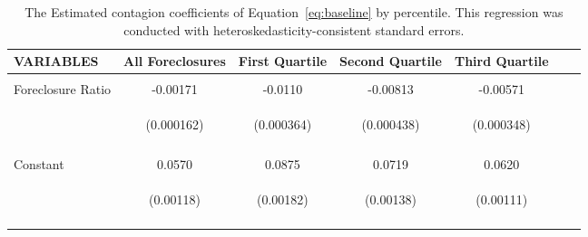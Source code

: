 
\begin{table}\Tiny\label{table:basic_results}
\begin{centering}
\caption{\Tiny The Estimated contagion coefficients of Equation~\ref{eq:baseline} by percentile. This regression was conducted with heteroskedasticity-consistent standard errors.}

\begin{tabular}{lcccccc} \hline

VARIABLES & All Foreclosures & First Quartile & Second Quartile & Third Quartile \\ \hline
 &    &  &  &  \\
Foreclosure Ratio                 &-0.00171 & -0.0110 & -0.00813&-0.00571 \\
&\begin{footnotesize}\tiny(0.000162)\end{footnotesize} & \begin{footnotesize}\tiny(0.000364)\end{footnotesize} &  \begin{footnotesize}\tiny(0.000438)\end{footnotesize} & 
\begin{footnotesize}\tiny(0.000348)\end{footnotesize} \\
\vspace{4pt}& \begin{footnotesize}\end{footnotesize} & \begin{footnotesize}\end{footnotesize} & \begin{footnotesize}\end{footnotesize} & \begin{footnotesize}\end{footnotesize} \\
Constant                          & 0.0570 &0.0875 &0.0719 &0.0620\\
& \begin{footnotesize}\tiny(0.00118)\end{footnotesize} & 
\begin{footnotesize}\tiny(0.00182)\end{footnotesize} & \begin{footnotesize}\tiny(0.00138)\end{footnotesize} & \begin{footnotesize}\tiny(0.00111)\end{footnotesize}  \\

 &  &  &  &  &  \\
 \hline
\end{tabular}
\end{centering}
\end{table}
